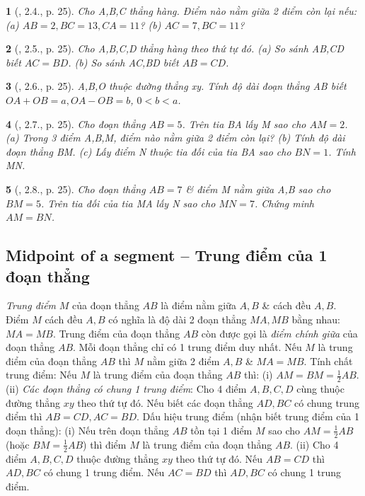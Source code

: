 \documentclass{article}
\newtheorem{baitoan}{}
\begin{document}
\begin{baitoan}[\cite{TLCT_THCS_Toan_6_hinh_hoc}, 2.4., p. 25]
	Cho A,B,C thẳng hàng. Điểm nào nằm giữa 2 điểm còn lại nếu: (a) $AB = 2,BC = 13,CA = 11$? (b) $AC = 7,BC = 11$?
\end{baitoan}

\begin{baitoan}[\cite{TLCT_THCS_Toan_6_hinh_hoc}, 2.5., p. 25]
	Cho A,B,C,D thẳng hàng theo thứ tự đó. (a) So sánh AB,CD biết $AC = BD$. (b) So sánh AC,BD biết $AB = CD$.
\end{baitoan}

\begin{baitoan}[\cite{TLCT_THCS_Toan_6_hinh_hoc}, 2.6., p. 25]
	A,B,O thuộc đường thẳng xy. Tính độ dài đoạn thẳng AB biết $OA + OB = a,OA - OB = b$, $0 < b < a$.
\end{baitoan}

\begin{baitoan}[\cite{TLCT_THCS_Toan_6_hinh_hoc}, 2.7., p. 25]
	Cho đoạn thẳng $AB = 5$. Trên tia BA lấy M sao cho $AM = 2$. (a) Trong 3 điểm A,B,M, điểm nào nằm giữa 2 điểm còn lại? (b) Tính độ dài đoạn thẳng BM. (c) Lấy điểm N thuộc tia đối của tia BA sao cho $BN = 1$. Tính MN.
\end{baitoan}

\begin{baitoan}[\cite{TLCT_THCS_Toan_6_hinh_hoc}, 2.8., p. 25]
	Cho đoạn thẳng $AB = 7$ \& điểm M nằm giữa A,B sao cho $BM = 5$. Trên tia đối của tia MA lấy N sao cho $MN = 7$. Chứng minh $AM = BN$.
\end{baitoan}

\subsection{Midpoint of a segment -- Trung điểm của 1 đoạn thẳng}
 \textit{Trung điểm} $M$ của đoạn thẳng $AB$ là điểm nằm giữa $A,B$ \& cách đều $A,B$. Điểm $M$ cách đều $A,B$ có nghĩa là độ dài 2 đoạn thẳng $MA,MB$ bằng nhau: $MA = MB$. Trung điểm của đoạn thẳng $AB$ còn được gọi là \textit{điểm chính giữa} của đoạn thẳng $AB$. Mỗi đoạn thẳng chỉ có 1 trung điểm duy nhất.  Nếu $M$ là trung điểm của đoạn thẳng $AB$ thì $M$ nằm giữa 2 điểm $A,B$ \& $MA = MB$.  {\sf Tính chất trung điểm}: Nếu $M$ là trung điểm của đoạn thẳng $AB$ thì: (i) $AM = BM = \frac{1}{2}AB$. (ii) \textit{Các đoạn thẳng có chung 1 trung điểm}: Cho 4 điểm $A,B,C,D$ cùng thuộc đường thẳng $xy$ theo thứ tự đó. Nếu biết các đoạn thẳng $AD,BC$ có chung trung điểm thì $AB = CD,AC = BD$.  {\sf Dấu hiệu trung điểm (nhận biết trung điểm của 1 đoạn thẳng)}: (i) Nếu trên đoạn thẳng $AB$ tồn tại 1 điểm $M$ sao cho $AM = \frac{1}{2}AB$ (hoặc $BM = \frac{1}{2}AB$) thì điểm $M$ là trung điểm của đoạn thẳng $AB$. (ii) Cho 4 điểm $A,B,C,D$ thuộc đường thẳng $xy$ theo thứ tự đó. Nếu $AB = CD$ thì $AD,BC$ có chung 1 trung điểm. Nếu $AC = BD$ thì $AD,BC$ có chung 1 trung điểm.
\end{document}
